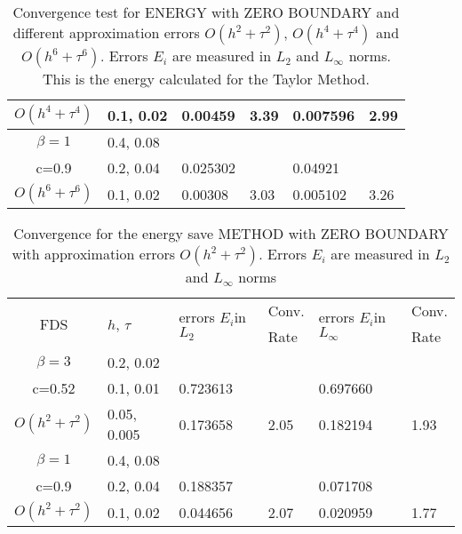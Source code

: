 \documentclass{article}
\begin{document}
\begin{table}[ht]
\begin{tabular}{||c|l|ll|ll||}
       $O(h^4+ \tau^4)$ &0.1, 0.02   & 0.00459& 3.39    &0.007596  & 2.99  \\
    \hline
  $\beta=1$     &0.4, 0.08   &                      &           &                   &      \\
      c=0.9    &0.2, 0.04        & 0.025302     &           & 0.04921     &       \\
     $O(h^6+ \tau^6)$         &  0.1, 0.02    & 0.00308 & 3.03  &0.005102 & 3.26        \\
	   \hline
			\hline 
		\end{tabular}
		\caption{Convergence test for ENERGY with ZERO BOUNDARY and different approximation errors $O(h^{2} + \tau^2 )$, $O(h^{4} + \tau^4 )$ and $O(h^{6} + \tau^6 )$. Errors $E_i$ are measured in $L_2$ and $L_\infty$ norms. This is the energy calculated for the Taylor Method.}
\label{tableB}
\end{table}

\begin{table}[ht]
\centering
\small
		\begin{tabular}{||c|l|ll|ll||}
			\hline
			\hline
      \multirow{2  }{*}{FDS}        & \multirow{2  }{*}{$h$, $\tau$}  & \multirow{2  }{*}{errors $E_i$in$L_2$}  &Conv.& \multirow{2  }{*}{errors $E_i$in$L_\infty$}  &Conv.  \\
	                                        &                                                     &                                                                 &  Rate &                                                                       & Rate \\
   			\hline 
					\hline 
  $\beta=3$                &0.2, 0.02         &                    &                &                  &                   \\
   c=0.52                     &0.1, 0.01         & 0.723613   &                & 0.697660  &                   \\
     $O(h^2 + \tau^ 2)$ &0.05, 0.005  & 0.173658   & 2.05       & 0.182194   & 1.93    \\
	   \hline
			\hline 
       $\beta=1$           & 0.4, 0.08       &                   &           &                 &   \\
                  c=0.9       & 0.2, 0.04        & 0.188357   &          &0.071708  &   \\
  $O(h^2+ \tau^2)$  & 0.1, 0.02       & 0.044656   & 2.07  &0.020959  & 1.77 \\
	   \hline
			\hline 
		\end{tabular}
		\caption{ Convergence for the energy save METHOD with ZERO BOUNDARY with approximation errors $O(h^{2} + \tau^2 )$. Errors $E_i$ are measured in $L_2$ and $L_\infty$ norms}
\label{tableB}
\end{table}
\end{document}
